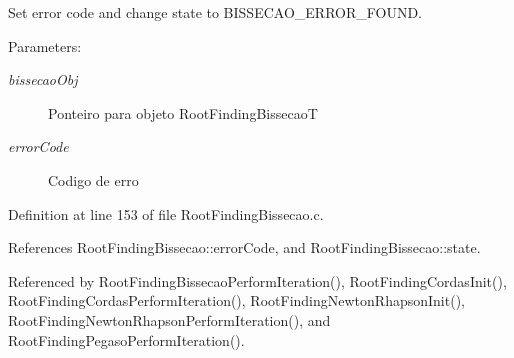 Set error code and change state to BISSECAO\_\-ERROR\_\-FOUND. 

\begin{Desc}
\item[Parameters:]
\begin{description}
\item[{\em bissecaoObj}]Ponteiro para objeto RootFindingBissecaoT \item[{\em errorCode}]Codigo de erro \end{description}
\end{Desc}


Definition at line 153 of file RootFindingBissecao.c.

References RootFindingBissecao::errorCode, and RootFindingBissecao::state.

Referenced by RootFindingBissecaoPerformIteration(), RootFindingCordasInit(), RootFindingCordasPerformIteration(), RootFindingNewtonRhapsonInit(), RootFindingNewtonRhapsonPerformIteration(), and RootFindingPegasoPerformIteration().